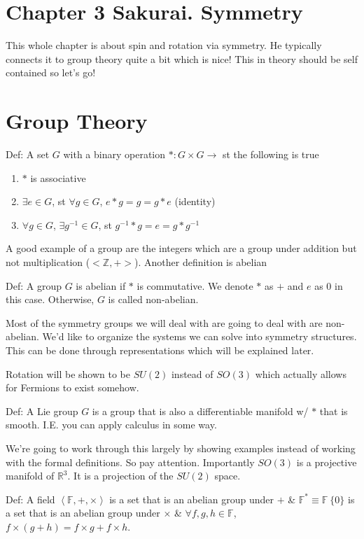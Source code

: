 \section{Chapter 3 Sakurai. Symmetry}
This whole chapter is about spin and rotation via symmetry. He typically connects it to
group theory quite a bit which is nice! This in theory should be self contained so let's go!

\section{Group Theory}
Def: A set $G$ with a binary operation $*: G \times G \rightarrow$ st the following is true
\begin{enumerate}
    \item $*$ is associative
    \item $\exists e \in G$, st $\forall g \in G$, $e * g = g = g * e$ (identity)
    \item $\forall g \in G$, $\exists g^{-1} \in G$, st $g^{-1} * g = e = g * g^{-1}$
\end{enumerate}
A good example of a group are the integers which are a group under addition but not
multiplication ($<\mathbb{Z}, +>$). Another definition is abelian

Def: A group $G$ is abelian if $*$ is commutative. 
We denote $*$ as $+$ and $e$ as 0 in this case. Otherwise, $G$ is called non-abelian.

Most of the symmetry groups we will deal with are going to deal with are non-abelian.
We'd like to organize the systems we can solve into symmetry structures. This can be done
through representations which will be explained later.

Rotation will be shown to be $SU(2)$ instead of $SO(3)$ which actually allows for Fermions
to exist somehow.

Def: A Lie group $G$ is a group that is also a differentiable manifold w/ $*$ that
is smooth. I.E. you can apply calculus in some way. 

We're going to work through this largely by showing examples instead of working
with the formal definitions. So pay attention. Importantly $SO(3)$ is a projective manifold
of $\mathbb{R}^3$. It is a projection of the $SU(2)$ space. 

Def: A field $\left<\mathbb{F}, +, \times\right>$ is a set that is an 
abelian group under $+$ \& $\mathbb{F}^* \equiv \mathbb{F} \ \{0\}$ is a set that is an
abelian group under $\times$ \& $\forall f, g, h \in \mathbb{F}$,
$f \times \left(g + h\right) = f \times g + f \times h$.

